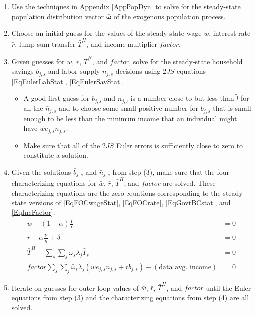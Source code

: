 \documentclass[letterpaper,12pt]{article}
\theoremstyle{definition}
\begin{document}
  \begin{enumerate}
    \item Use the techniques in Appendix \ref{AppPopDyn} to solve for the steady-state population distribution vector $\bm{\bar{\omega}}$ of the exogenous population process.
    \item Choose an initial guess for the values of the steady-state wage $\bar{w}$, interest rate $\bar{r}$, lump-sum transfer $\bar{T}^H$, and income multiplier $factor$.
    \item Given guesses for $\bar{w}$, $\bar{r}$, $\bar{T}^H$, and $factor$, solve for the steady-state household savings $\bar{b}_{j,s}$ and labor supply $\bar{n}_{j,s}$ decisions using $2JS$ equations \eqref{EqEulerLabStat}, \eqref{EqEulerSavStat}.
      \begin{itemize}
        \item A good first guess for $\bar{b}_{j,s}$ and $\bar{n}_{j,s}$ is a number close to but less than $\tilde{l}$ for all the $\bar{n}_{j,s}$ and to choose some small positive number for $\bar{b}_{j,s}$ that is small enough to be less than the minimum income that an individual might have $\bar{w}e_{j,s}\bar{n}_{j,s}$.
        \item Make sure that all of the $2JS$ Euler errors is sufficiently close to zero to constitute a solution.
      \end{itemize}
    \item Given the solutions $\bar{b}_{j,s}$ and $\bar{n}_{j,s}$ from step (3), make sure that the four characterizing equations for $\bar{w}$, $\bar{r}$, $\bar{T}^H$, and $factor$ are solved. These characterizing equations are the zero equations corresponding to the steady-state versions of \eqref{EqFOCwageStat}, \eqref{EqFOCrate}, \eqref{EqGovtBCstat}, and \eqref{EqIncFactor}.
      \begin{align}
        \bar{w} - (1-\alpha)\frac{\bar{Y}}{\bar{L}} &= 0 \label{EqFOCwageSS0} \\
        \bar{r} - \alpha\frac{\bar{Y}}{\bar{K}} + \delta &= 0 \label{EqFOCrateSS0} \\
        \bar{T}^H - \sum_s \sum_j \bar{\omega}_s\lambda_j \bar{T}_{s} &= 0 \label{EqGovtBCSS0} \\
        factor\sum_s \sum_j \bar{\omega}_s\lambda_j\left(\bar{w}e_{j,s}\bar{n}_{j,s} + \bar{r}\bar{b}_{j,s}\right) - \left(\text{data avg. income}\right) &= 0 \label{EqIncFactorSS0}
      \end{align}
    \item Iterate on guesses for outer loop values of $\bar{w}$, $\bar{r}$, $\bar{T}^H$, and $factor$ until the Euler equations from step (3) and the characterizing equations from step (4) are all solved.
  \end{enumerate}
\end{document}
